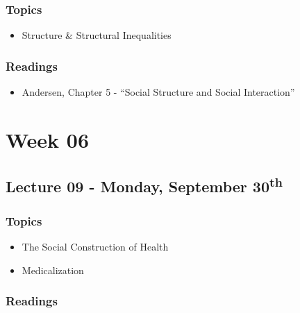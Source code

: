 \documentclass[]{book}
\providecommand{\tightlist}{%
  \setlength{\itemsep}{0pt}\setlength{\parskip}{0pt}}
\begin{document}
\hypertarget{topics-9}{%
\subsubsection*{Topics}\label{topics-9}}

\begin{itemize}
\tightlist
\item
  Structure \& Structural Inequalities
\end{itemize}

\hypertarget{readings-8}{%
\subsubsection*{Readings}\label{readings-8}}

\begin{itemize}
\tightlist
\item
  Andersen, Chapter 5 - ``Social Structure and Social Interaction''
\end{itemize}

\hypertarget{week-06}{%
\section*{Week 06}\label{week-06}}

\hypertarget{lecture-09---monday-september-30th}{%
\subsection*{\texorpdfstring{Lecture 09 - Monday, September 30\textsuperscript{th}}{Lecture 09 - Monday, September 30th}}\label{lecture-09---monday-september-30th}}

\hypertarget{topics-10}{%
\subsubsection*{Topics}\label{topics-10}}

\begin{itemize}
\tightlist
\item
  The Social Construction of Health
\item
  Medicalization
\end{itemize}

\hypertarget{readings-9}{%
\subsubsection*{Readings}\label{readings-9}}
\end{document}
